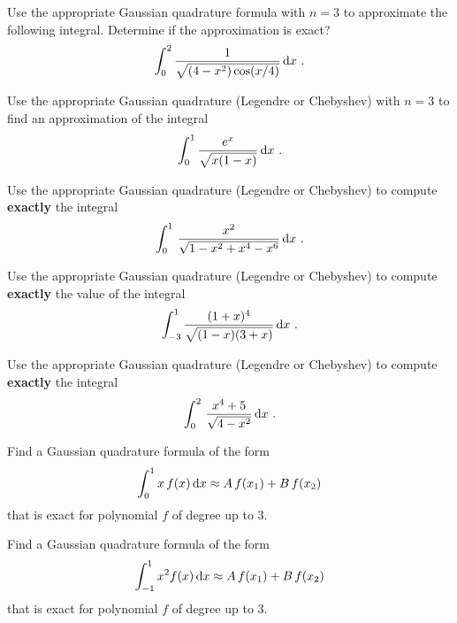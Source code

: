 \begin{question}
Use the appropriate Gaussian quadrature formula with $n=3$ to
approximate the following integral.  Determine if the approximation is
exact?
\[
\int_0^2 \frac{1}{\sqrt{(4-x^2)\cos(x/4)}}\,\mathrm{d}x \ .
\]
\label{diffQ31}
\end{question}

\begin{question}
Use the appropriate Gaussian quadrature (Legendre or Chebyshev) with
$n=3$ to find an approximation of the integral
\[
\int_0^1 \frac{e^x}{\sqrt{x(1-x)}} \dx{x} \ .
\]
\label{diffQ32}
\end{question}

\begin{question}
Use the appropriate Gaussian quadrature (Legendre or Chebyshev) to
compute {\bfseries exactly} the integral
\[
\int_0^1\,\frac{x^2}{\sqrt{1-x^2+x^4-x^6}}\,\mathrm{d}x \ .
\]
\label{diffQ33}
\end{question}

\begin{question}
Use the appropriate Gaussian quadrature (Legendre or Chebyshev) to 
compute {\bfseries exactly} the value of the integral
\[
\int_{-3}^1 \frac{(1+x)^4}{\sqrt{(1-x)(3+x)}} \,\mathrm{d}x \ .
\]
\label{diffQ34}
\end{question}

\begin{question}
Use the appropriate Gaussian quadrature (Legendre or Chebyshev) to
compute {\bfseries exactly} the integral
\[
\int_0^2\,\frac{x^4+5}{\sqrt{4-x^2}} \dx{x} \ .
\]
\label{diffQ35}
\end{question}

\begin{question}
Find a Gaussian quadrature formula of the form
\begin{equation}\label{quadFormQuest1}
\int_0^1 x\,f(x)\,\mathrm{d}x \approx A\,f(x_1) + B\,f(x_2)
\end{equation}
that is exact for polynomial $f$ of degree up to $3$.
\label{diffQ36}
\end{question}

\begin{question}
Find a Gaussian quadrature formula of the form
\begin{equation}\label{quadFormQuest2}
\int_{-1}^1 x^2 f(x)\,\mathrm{d}x \approx A\,f(x_1) + B\,f(x_2)
\end{equation}
that is exact for polynomial $f$ of degree up to $3$.
\label{diffQ37}
\end{question}

